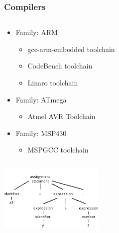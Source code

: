 \documentclass{beamer}
\begin{document}
\begin{frame}
	\frametitle{Compilers}
	\begin{columns}[c]
		\begin{column}{30cm}
			\vspace{.1cm}
			\begin{itemize}
				\justifying
				\item Family: ARM
				\begin{itemize}
					\item gcc-arm-embedded toolchain
					\item CodeBench toolchain
					\item Linaro toolchain
				\end{itemize}
				\item Family: ATmega
				\begin{itemize}
					\item Atmel AVR Toolchain
				\end{itemize}
				\item Family: MSP430
				\begin{itemize}
					\item MSPGCC toolchain
				\end{itemize}
			\end{itemize}
		\end{column}
	\end{columns}
	\vspace{.5cm}
	\hspace*{5.5cm} \includegraphics[width=5cm]{figs/parse-tree.png}
\end{frame}
\end{document}
